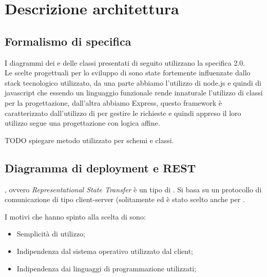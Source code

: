 \section{Descrizione architettura}


\subsection{Formalismo di specifica}

I diagrammi dei  e delle classi presentati di seguito utilizzano la specifica  2.0.
\\

Le scelte progettuali per lo sviluppo di \ProjectName{} sono state fortemente influenzate dallo stack tecnologico utilizzato, da una parte abbiamo l'utilizzo di node.js e quindi di javascript che essendo un linguaggio funzionale rende innaturale l'utilizzo di classi per la progettazione, dall'altra abbiamo Express, questo framework è caratterizzato dall'utilizzo di  per gestire le richieste e quindi appreso il loro utilizzo segue una progettazione con logica affine.

TODO spiegare metodo utilizzato per schemi e classi.

\subsection{Diagramma di deployment e REST}
, ovvero \textit{Representational State Transfer} è un tipo di . Si basa su un protocollo di comunicazione  di tipo client-server (solitamente  ed è stato scelto anche per \ProjectName{}.

I motivi che hanno spinto alla scelta di  sono:
\begin{itemize}
\item Semplicità di utilizzo;
\item Indipendenza dal sistema operativo utilizzato dal client;
\item Indipendenza dai linguaggi di programmazione utilizzati;
\end{itemize}

